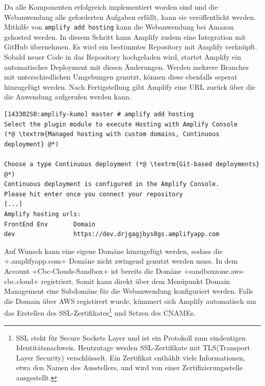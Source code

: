 Da alle Komponenten erfolgreich implementiert worden sind und die Webanwendung alle geforderten Aufgaben erfüllt, kann sie veröffentlicht werden.
Mithilfe von \verb+amplify add hosting+ kann die Webanwendung bei Amazon gehosted werden.
In diesem Schritt kann Amplify zudem eine Integration mit GitHub übernehmen.
Es wird ein bestimmtes Repository mit Amplify verknüpft.
Sobald neuer Code in das Repository hochgeladen wird, startet Amplify ein automatisches Deployment mit diesen Änderungen.
Werden mehrere Branches mit unterschiedlichen Umgebungen genutzt, können diese ebenfalls seperat hinzugefügt werden.
Nach Fertigstellung gibt Amplify eine URL zurück über die die Anwendung aufgerufen werden kann.
\\
\begin{lstlisting}[basicstyle=\ttfamily\small, breaklines=true , frame = single, backgroundcolor=\color{flashwhite} ]
[143302S0:amplify-kumo] master # amplify add hosting
Select the plugin module to execute Hosting with Amplify Console
(*@ \textrm{Managed hosting with custom domains, Continuous deployment} @*)

Choose a type Continuous deployment (*@ \textrm{Git-based deployments} @*)
Continuous deployment is configured in the Amplify Console.
Please hit enter once you connect your repository
[...]
Amplify hosting urls:
FrontEnd Env       Domain
dev                https://dev.drjgagjbys8gs.amplifyapp.com

    \end{lstlisting}
\clearpage
Auf Wunsch kann eine eigene Domäne hinzugefügt werden, sodass die \spverb+.amplifyapp.com+ Domäne nicht zwingend genutzt werden muss.
In dem Account \spverb+Cbc-Clouds-Sandbox+ ist bereits die Domäne \spverb+sandboxzone.aws-cbc.cloud+ registriert.
Somit kann direkt über dem Menüpunkt \glqq Domain Management\grqq{} eine Subdomäne für die Webanwendung konfiguriert werden.
Falls die Domain über AWS registirert wurde, kümmert sich Amplify automatisch um das Erstellen des SSL-Zertifikates\footnote{SSL steht für Secure Sockets Layer und ist ein Protokoll zum eindeutigen Identitätsnachweis. Heutzutage werden SSL-Zertifikate mit TLS(Transport Layer Security) verschlüsselt. Ein Zertifikat enthählt viele Informationen, etwa den Namen des Ausstellers, und wird von einer Zertifizierungsstelle ausgestellt.} und Setzen des CNAMEs.\\


